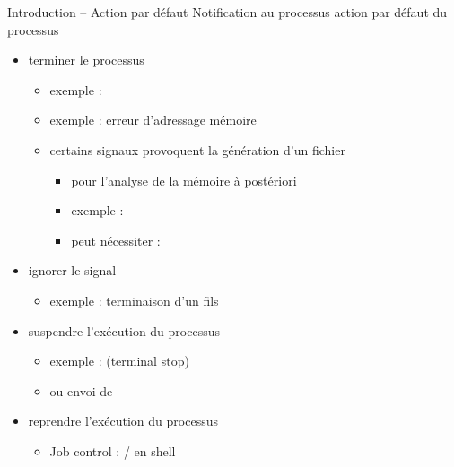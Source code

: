 \begin {frame} {Introduction -- Action par défaut}
    Notification au processus \implique action par défaut du processus

    \begin {itemize}
	\item terminer le processus
	    \begin {itemize}
		\item exemple : 
		\item exemple :  \implique erreur
		    d'adressage mémoire
		\item certains signaux provoquent la génération d'un
		    fichier 
		    \begin {itemize}
			\item pour l'analyse de la mémoire à postériori
			\item exemple : 
			\item peut nécessiter : 

		    \end {itemize}
	    \end {itemize}
	\item ignorer le signal
	    \begin {itemize}
		\item exemple : terminaison d'un fils
		    \implique {}
	    \end {itemize}
	\item suspendre l'exécution du processus
	    \begin {itemize}
		\item exemple : 
		    \implique {} (terminal stop)
		\item ou envoi de 
	    \end {itemize}
	\item reprendre l'exécution du processus
	    \begin {itemize}
		\item Job control : / en shell \implique

	    \end {itemize}
    \end {itemize}
\end {frame}

